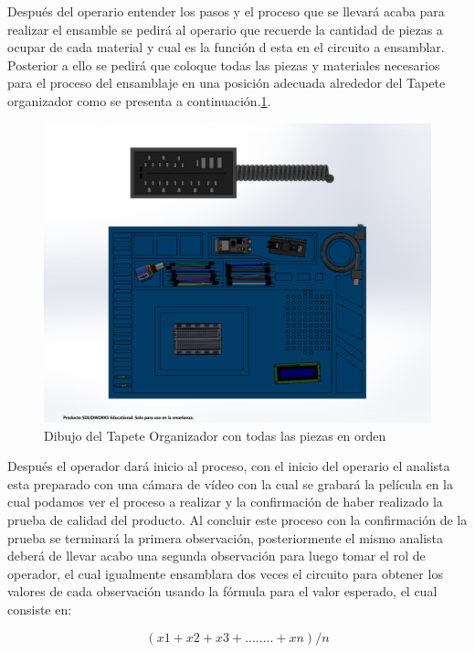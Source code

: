     
        Después del operario entender los pasos y el proceso que se llevará acaba para realizar el ensamble se pedirá al operario que recuerde la cantidad de piezas a ocupar de cada material y cual es la función d esta en el circuito a ensamblar.
        \\Posterior a ello se pedirá que coloque todas las piezas y materiales necesarios para el proceso del ensamblaje en una posición adecuada alrededor del Tapete organizador como se presenta a continuación.\ref{fig:ensamblaje1}.
    \begin{figure}[H]
        \centering
        \includegraphics[trim = {55mm 15mm 48mm 20mm},clip,scale=0.5]{19/Img/ensamblaje1.pdf}
        \caption{Dibujo del Tapete Organizador con todas las piezas en orden}
        \label{fig:ensamblaje1}
    \end{figure}

        
         Después el operador dará inicio al proceso, con el inicio del operario el analista esta preparado con una cámara de vídeo con la cual se grabará la película en la cual podamos ver el proceso a realizar y la confirmación de haber realizado la prueba de calidad del producto.
        Al concluir este proceso con la confirmación de la prueba se terminará la primera observación, posteriormente el mismo analista deberá de llevar acabo una segunda observación para luego tomar el rol de operador, el cual igualmente ensamblara dos veces el circuito para obtener los valores  de cada observación usando la  fórmula para el valor esperado, el cual consiste en:
    
        \begin{equation}
        \label{eq1}
        (x1+x2+x3+........+xn)/n 
    \end{equation}
    
